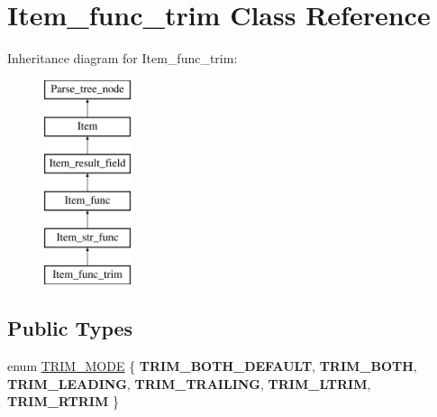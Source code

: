 \hypertarget{classItem__func__trim}{}\section{Item\+\_\+func\+\_\+trim Class Reference}
\label{classItem__func__trim}
Inheritance diagram for Item\+\_\+func\+\_\+trim\+:\begin{figure}[H]
\begin{center}
\leavevmode
\includegraphics[height=6.000000cm]{classItem__func__trim}
\end{center}
\end{figure}
\subsection*{Public Types}
\begin{DoxyCompactItemize}
\item 
enum \mbox{\hyperlink{classItem__func__trim_a69d666d541f868b8499aaad03911cbf1}{T\+R\+I\+M\+\_\+\+M\+O\+DE}} \{ \newline
{\bfseries T\+R\+I\+M\+\_\+\+B\+O\+T\+H\+\_\+\+D\+E\+F\+A\+U\+LT}, 
{\bfseries T\+R\+I\+M\+\_\+\+B\+O\+TH}, 
{\bfseries T\+R\+I\+M\+\_\+\+L\+E\+A\+D\+I\+NG}, 
{\bfseries T\+R\+I\+M\+\_\+\+T\+R\+A\+I\+L\+I\+NG}, 
\newline
{\bfseries T\+R\+I\+M\+\_\+\+L\+T\+R\+IM}, 
{\bfseries T\+R\+I\+M\+\_\+\+R\+T\+R\+IM}
 \}
\end{DoxyCompactItemize}
